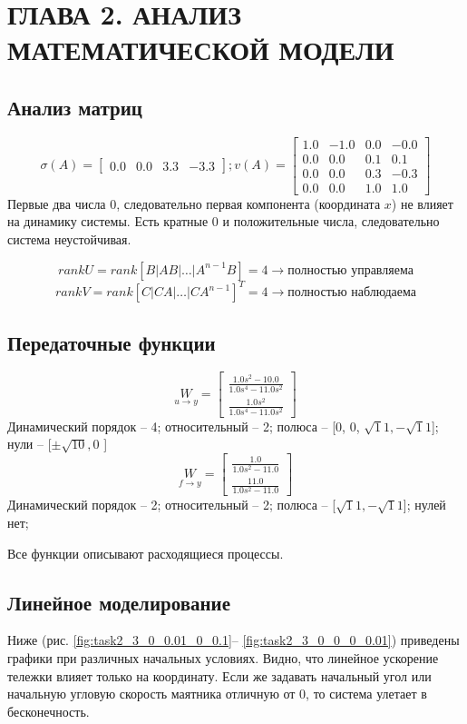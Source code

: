 \section{ГЛАВА 2. АНАЛИЗ МАТЕМАТИЧЕСКОЙ МОДЕЛИ}

\subsection{Анализ матриц}
\[\sigma(A) = \begin{bmatrix}
  0.0 &  0.0 &  3.3 & -3.3
\end{bmatrix}; v(A) = \begin{bmatrix}
  1.0 & -1.0 &  0.0 & -0.0\\
  0.0 &  0.0 &  0.1 &  0.1\\
  0.0 &  0.0 &  0.3 & -0.3\\
  0.0 &  0.0 &  1.0 &  1.0
\end{bmatrix} \]
Первые два числа 0, следовательно первая компонента (координата \(x\)) не влияет на динамику системы. Есть кратные 0 и положительные числа, следовательно система неустойчивая. 

\[rankU = rank[B | AB | \hdots | A^{n-1}B] = 4 \rightarrow \text{полностью управляема}\]
\[rankV = rank[C | CA | \hdots | CA^{n-1}]^T = 4 \rightarrow \text{полностью наблюдаема}\]

\subsection{Передаточные функции}
\[\underset{u \to y}W = \begin{bmatrix} \frac{1.0 s^{2} - 10.0}{1.0 s^{4} - 11.0 s^{2}} \\ \frac{1.0 s^{2}}{1.0 s^{4} - 11.0 s^{2}} \end{bmatrix} \]
Динамический порядок -- 4; относительный -- 2; полюса -- [0, 0, \(\sqrt11, -\sqrt11\)]; нули -- [\( \pm \sqrt{10}, 0\) ]
\[\underset{f \to y}W = \begin{bmatrix} \frac{1.0}{1.0 s^{2} - 11.0} \\ \frac{11.0}{1.0 s^{2} - 11.0} \end{bmatrix} \]
Динамический порядок -- 2; относительный -- 2; полюса -- [\(\sqrt11, -\sqrt11\)]; нулей нет;

Все функции описывают расходящиеся процессы.

\subsection{Линейное моделирование}
Ниже (рис. \ref{fig:task2_3_0_0.01_0_0.1}-- \ref{fig:task2_3_0_0_0_0.01}) приведены графики при различных начальных условиях. Видно, что линейное ускорение тележки влияет только на координату. Если же задавать начальный угол или начальную угловую скорость маятника отличную от 0, то система улетает в бесконечность. 

